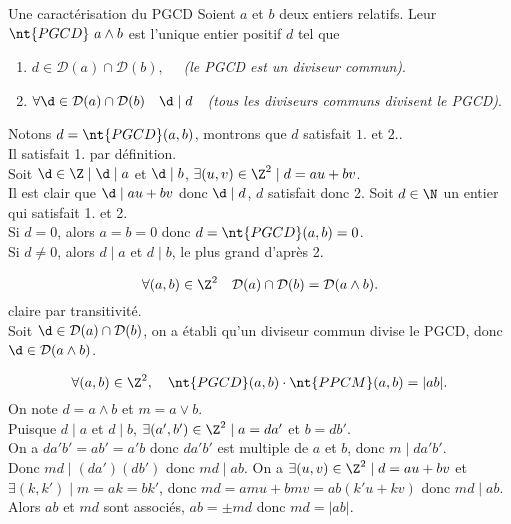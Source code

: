 \documentclass[11pt]{article}
\newcommand*{\PPCM}{\nt{PPCM}}
\newcommand*{\PGCD}{\nt{PGCD}}
\renewcommand*{\D}{\mathcal{D}}
\begin{document}
\begin{thm}{Une caractérisation du PGCD}{}
    Soient $a$ et $b$ deux entiers relatifs. Leur $\PGCD~a\land b$ est l'unique entier positif $d$ tel que
    \begin{enumerate}[topsep=0pt,itemsep=-0.9 ex]
        \item $d\in\D(a)\cap\D(b),\quad$ \emph{(le PGCD est un diviseur commun)}.
        \item $\forall \d\in\D(a)\cap\D(b)\quad\d\mid d\quad$\emph{(tous les diviseurs communs divisent le PGCD)}.
    \end{enumerate}
    \tcblower
    Notons $d=\PGCD(a,b)$, montrons que $d$ satisfait $1.$ et $2.$.\\
    Il satisfait 1. par définition.\\
    Soit $\d\in\Z\mid\d\mid a$ et $\d\mid b$, $\exists (u,v)\in\Z^2\mid d=au+bv$.\\
    Il est clair que $\d\mid au+bv$ donc $\d\mid d$, $d$ satisfait donc 2.\n
    Soit $d\in\N$ un entier qui satisfait 1. et 2.\\
    Si $d=0$, alors $a=b=0$ donc $d=\PGCD(a,b)=0$.\\
    Si $d\neq0$, alors $d\mid a$ et $d\mid b$, le plus grand d'après 2.
\end{thm}

\begin{corr}{}{}
    \begin{equation*}
        \forall(a,b)\in\Z^2\quad\D(a)\cap\D(b)=\D(a\land b).
    \end{equation*}
    \tcblower
    \fbox{$\supset$} claire par transitivité.\\
    \fbox{$\subset$} Soit $\d\in\D(a)\cap\D(b)$, on a établi qu'un diviseur commun divise le PGCD, donc $\d\in\D(a\land b)$.
\end{corr}

\pagebreak

\begin{prop}{}{}
    \begin{equation*}
        \forall(a,b)\in\Z^2,\quad\PGCD(a,b)\cdot\PPCM(a,b)=|ab|.
    \end{equation*}
    \tcblower
    On note $d=a\land b$ et $m=a\lor b$.\\
    Puisque $d\mid a$ et $d\mid b$, $\exists (a',b')\in\Z^2\mid a=da'$ et $b=db'$.\\
    On a $da'b'=ab'=a'b$ donc $da'b'$ est multiple de $a$ et $b$, donc $m\mid da'b'$.\\
    Donc $md\mid (da')(db')$ donc $md\mid ab$.\n
    On a $\exists (u,v)\in\Z^2\mid d=au+bv$ et $\exists (k,k')\mid m=ak=bk'$, donc $md=amu+bmv=ab(k'u+kv)$ donc $md\mid ab$.\n
    Alors $ab$ et $md$ sont associés, $ab=\pm md$ donc $md=|ab|$. 
\end{prop}
\end{document}
